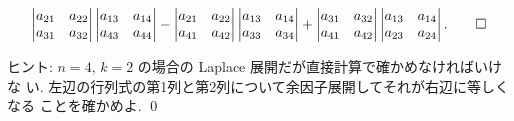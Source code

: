 \documentclass[12pt,twoside]{jarticle}
\begin{document}
\begin{question}
{\begin{align*}
\begin{vmatrix}
      a_{21} & a_{22} \\
      a_{31} & a_{32} \\
    \end{vmatrix}
    \begin{vmatrix}
      a_{13} & a_{14} \\
      a_{43} & a_{44} \\
    \end{vmatrix}
    -
    \begin{vmatrix}
      a_{21} & a_{22} \\
      a_{41} & a_{42} \\
    \end{vmatrix}
    \begin{vmatrix}
      a_{13} & a_{14} \\
      a_{33} & a_{34} \\
    \end{vmatrix}
    +
    \begin{vmatrix}
      a_{31} & a_{32} \\
      a_{41} & a_{42} \\
    \end{vmatrix}
    \begin{vmatrix}
      a_{13} & a_{14} \\
      a_{23} & a_{24} \\
    \end{vmatrix}.
    \qed
  \end{align*}
  }
\end{question}

\noindent
ヒント: $n=4$, $k=2$ の場合の Laplace 展開だが直接計算で確かめなければいけな
い.  左辺の行列式の第1列と第2列について余因子展開してそれが右辺に等しくなる
ことを確かめよ.
\qed

\end{document}
